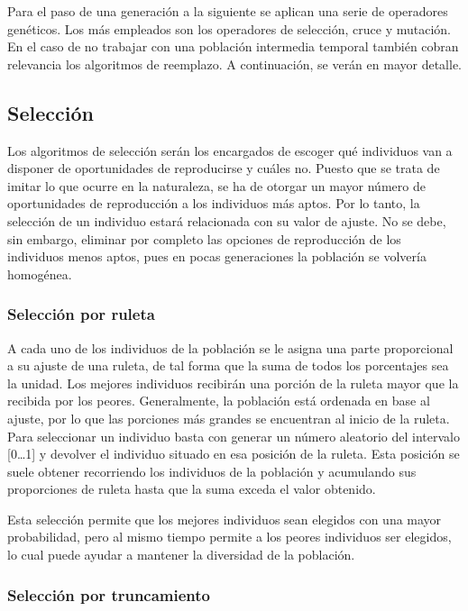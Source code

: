 Para el paso de una generación a la siguiente se aplican una serie de operadores genéticos. Los más empleados son los operadores de selección, cruce y mutación. En el caso de no trabajar con una población intermedia temporal también cobran relevancia los algoritmos de reemplazo. A continuación, se verán en mayor detalle.


\subsection {Selección} 

Los algoritmos de selección serán los encargados de escoger qué individuos van a disponer de oportunidades de reproducirse y cuáles no. Puesto que se trata de imitar lo que ocurre en la naturaleza, se ha de otorgar un mayor número de oportunidades de reproducción a los individuos más aptos. Por lo tanto, la selección de un individuo estará relacionada con su valor de ajuste. No se debe, sin embargo, eliminar por completo las opciones de reproducción de los individuos menos aptos, pues en pocas generaciones la población se volvería homogénea.


\subsubsection {Selección por ruleta}

A cada uno de los individuos de la población se le asigna una parte proporcional a su ajuste de una ruleta, de tal forma que la suma de todos los porcentajes sea la unidad. Los mejores individuos recibirán una porción de la ruleta mayor que la recibida por los peores. Generalmente, la población está ordenada en base al ajuste, por lo que las porciones más grandes se encuentran al inicio de la ruleta. Para seleccionar un individuo basta con generar un número aleatorio del intervalo [0…1] y devolver el individuo situado en esa posición de la ruleta. Esta posición se suele obtener recorriendo los individuos de la población y acumulando sus proporciones de ruleta hasta que la suma exceda el valor obtenido.

Esta selección permite que los mejores individuos sean elegidos con una mayor probabilidad, pero al mismo tiempo permite a los peores individuos ser elegidos, lo cual puede ayudar a mantener la diversidad de la población.


\subsubsection {Selección por truncamiento}

